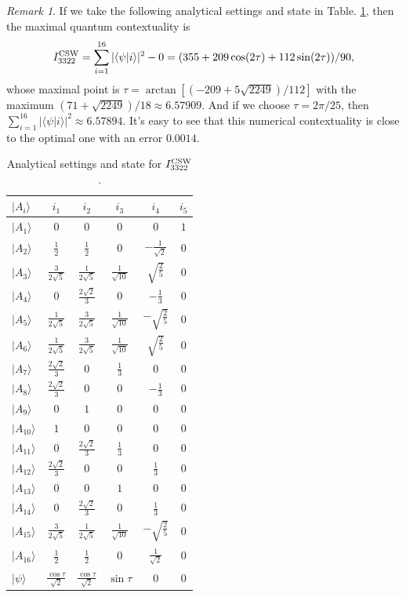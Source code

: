 \documentclass[pra,aps,notitlepage,superscriptaddress,showpacs,showkeys]{revtex4-1}
\theoremstyle{definition}
\theoremstyle{remark}
\newtheorem{remark}{Remark}
\begin{document}
\begin{remark}
If we take the following analytical settings and state in Table. \ref{analytical}, then  the maximal quantum contextuality  is
\[
I_{3322}^{\rm CSW} = \sum_{i=1}^{16} |\langle \psi|i\rangle|^2 -0= (355+209\cos(2\tau)+112\sin(2\tau))/90,
\]
whose maximal point is $\tau = \arctan[(-209 + 5 \sqrt{2249})/112]$ with the maximum $\left(71+\sqrt{2249}\right)/18 \approx 6.57909$.
And if we choose $\tau = 2\pi/25$, then $\sum_{i=1}^{16} |\langle \psi|i\rangle|^2 \approx 6.57894$. It's easy to see that this numerical contextuality is close to the optimal one with an error $0.0014$.
\begin{table}[t]
\centering
  \begin{tabular}{lccccc} \hline \hline
$|A_i\rangle$ & $i_1$ & $i_2$ & $i_3$ & $i_4$ & $i_5$ \\
\hline
$|A_1\rangle$  & $0$ & $0$ & $0$ & $0$ & $1$ \\
$|A_2\rangle$  & $\frac{1}{2}$ & $\frac{1}{2}$ & $0$ & $-\frac{1}{\sqrt{2}}$ & $0$ \\
$|A_3\rangle$  & $\frac{3}{2 \sqrt{5}}$ & $\frac{1}{2 \sqrt{5}}$ & $\frac{1}{\sqrt{10}}$ & $\sqrt{\frac{2}{5}}$ & $0$ \\
$|A_4\rangle$  & $0$ & $\frac{2 \sqrt{2}}{3}$ & $0$ & $-\frac{1}{3}$ & $0$ \\
$|A_5\rangle$  & $\frac{1}{2 \sqrt{5}}$ & $\frac{3}{2 \sqrt{5}}$ & $\frac{1}{\sqrt{10}}$ & $-\sqrt{\frac{2}{5}}$ & $0$ \\
$|A_6\rangle$  & $\frac{1}{2 \sqrt{5}}$ & $\frac{3}{2 \sqrt{5}}$ & $\frac{1}{\sqrt{10}}$ & $\sqrt{\frac{2}{5}}$ & $0$ \\
$|A_7\rangle$  & $\frac{2 \sqrt{2}}{3}$ & $0$ & $\frac{1}{3}$ & $0$ & $0$ \\
$|A_8\rangle$  & $\frac{2 \sqrt{2}}{3}$ & $0$ & $0$ & $-\frac{1}{3}$ & $0$ \\
$|A_9\rangle$  & $0$ & $1$ & $0$ & $0$ & $0$ \\
$|A_{10}\rangle$ & $1$ & $0$ & $0$ & $0$ & $0$ \\
$|A_{11}\rangle$ & $0$ & $\frac{2 \sqrt{2}}{3}$ & $\frac{1}{3}$ & $0$ & $0$ \\
$|A_{12}\rangle$ & $\frac{2 \sqrt{2}}{3}$ & $0$ & $0$ & $\frac{1}{3}$ & $0$ \\
$|A_{13}\rangle$ & $0$ & $0$ & $1$ & $0$ & $0$ \\
$|A_{14}\rangle$ & $0$ & $\frac{2 \sqrt{2}}{3}$ & $0$ & $\frac{1}{3}$ & $0$ \\
$|A_{15}\rangle$ & $\frac{3}{2 \sqrt{5}}$ & $\frac{1}{2 \sqrt{5}}$ & $\frac{1}{\sqrt{10}}$ & $-\sqrt{\frac{2}{5}}$ & $0$  \\
$|A_{16}\rangle$ & $\frac{1}{2}$ & $\frac{1}{2}$ & $0$ & $\frac{1}{\sqrt{2}}$ & $0$ \\
\hline
$|\psi\rangle$ & $\frac{\cos\tau}{\sqrt{2}}$ & $\frac{\cos\tau}{\sqrt{2}}$ & $\sin\tau$ & $0$ & $0$ \\
  \hline \hline
   \end{tabular}
\caption{Analytical settings and state for $I_{3322}^{\rm CSW}$.}
\label{analytical}
\end{table}
\end{remark}
\end{document}
